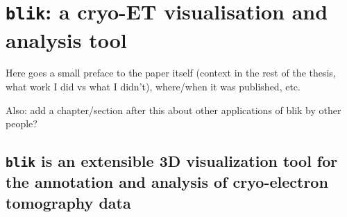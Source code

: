 \chapter{\texttt{blik}: a cryo-ET visualisation and analysis tool}

Here goes a small preface to the paper itself (context in the rest of the thesis, what work I did vs what I didn't), where/when it was published, etc.

Also: add a chapter/section after this about other applications of blik by other people?

\localtableofcontents  %
\section*{\texttt{blik} is an extensible 3D visualization tool for the annotation and analysis of cryo-electron tomography data}  %

% 

